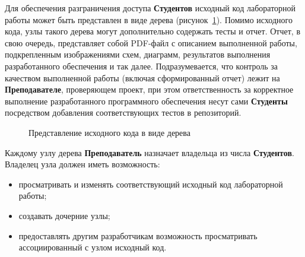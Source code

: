 \documentclass{bmstu}
\begin{document}
  Для обеспечения разграничения доступа \textbf{Студентов} исходный код
  лабораторной работы может быть представлен в виде дерева
  (рисунок~\ref{fig:source-code-tree}).
  Помимо исходного кода, узлы такого дерева могут дополнительно содержать тесты
  и отчет.
  Отчет, в свою очередь, представляет собой PDF-файл с описанием выполненной
  работы, подкрепленным изображениями схем, диаграмм, результатов выполнения
  разработанного обеспечения и так далее.
  Подразумевается, что контроль за качеством выполненной работы (включая
  сформированный отчет) лежит на \textbf{Преподавателе}, проверяющем проект,
  при этом ответственность за корректное выполнение разработанного программного
  обеспечения несут сами \textbf{Студенты} посредством добавления
  соответствующих тестов в репозиторий.

  \begin{figure}[ht]
    \centering


    \caption{Представление исходного кода в виде дерева}
    \label{fig:source-code-tree}
  \end{figure}

  \FloatBarrier

  Каждому узлу дерева \textbf{Преподаватель} назначает владельца из числа
  \textbf{Студентов}.
  Владелец узла должен иметь возможность:
  \begin{itemize}[label=---]
    \item просматривать и изменять соответствующий исходный код
      лабораторной работы;
    \item создавать дочерние узлы;
    \item предоставлять другим разработчикам возможность просматривать
      ассоциированный с узлом исходный код.
  \end{itemize}
\end{document}
